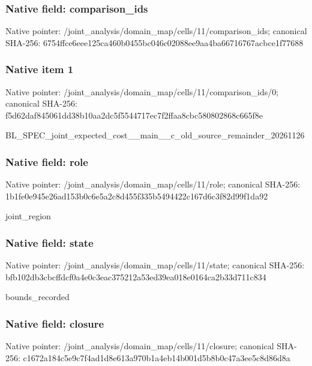 \documentclass[10pt,a4paper]{article}
\begin{document}
\subsubsection{Native field: comparison\_ids}


Native pointer: /joint\_analysis/domain\_m\allowbreak{}ap/cells/11/comparison\_i\allowbreak{}ds; canonical SHA-256: 6754ffce6eee125ca460b045\allowbreak{}5bc046c02088ee9aa4ba6671\allowbreak{}6767acbce1f77688



\subsubsection{Native item 1}


Native pointer: /joint\_analysis/domain\_m\allowbreak{}ap/cells/11/comparison\_i\allowbreak{}ds/0; canonical SHA-256: f5d62daf845061dd38b10aa2\allowbreak{}dc5f5544717ec7f2ffaa8cbc\allowbreak{}580802868c665f8e


BL\_SPEC\_joint\_expected\_c\allowbreak{}ost\_\_main\_\_c\_old\_source\_\allowbreak{}remainder\_20261126


\subsubsection{Native field: role}


Native pointer: /joint\_analysis/domain\_m\allowbreak{}ap/cells/11/role; canonical SHA-256: 1b1fe0e945e26ad153b0c6e5\allowbreak{}a2c8d455f335b5494422c167\allowbreak{}d6c3f82d99f1da92


joint\_region


\subsubsection{Native field: state}


Native pointer: /joint\_analysis/domain\_m\allowbreak{}ap/cells/11/state; canonical SHA-256: bfb102db3cbcffdcf0a4e0c3\allowbreak{}eac375212a53ed39ea018e01\allowbreak{}64ca2b33d711c834


bounds\_recorded


\subsubsection{Native field: closure}


Native pointer: /joint\_analysis/domain\_m\allowbreak{}ap/cells/11/closure; canonical SHA-256: c1672a184c5e9c7f4ad1d8e6\allowbreak{}13a970b1a4eb14b001d5b8b0\allowbreak{}c47a3ee5c8d86d8a
\end{document}
